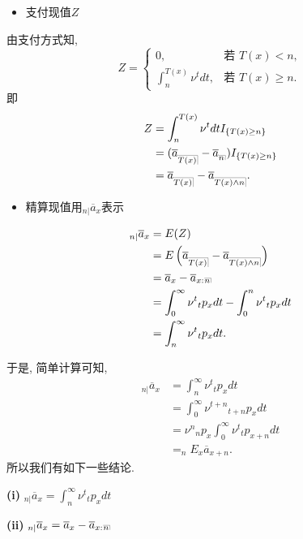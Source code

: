 \documentclass[a4paper,openany, 10pt]{ctexbook}
\makeatletter
\newcommand{\hei}{\CJKfamily{hei}}      %
\def\z{\left}
\def\y{\right}
\DeclareRobustCommand{\annu}[1]{_{%
    \def\arraystretch{0}%
    \setlength\arraycolsep{1pt}%
    \setlength\arrayrulewidth{.2pt}%
    \begin{array}[b]{@{}c|}\hline
        \\[\arraycolsep]%
        \scriptstyle #1%
    \end{array}%
}}
\makeatother
\begin{document}
\begin{itemize}
    \item[{\bf\hei2.}] 支付现值$Z$
\end{itemize}
由支付方式知,
$$
    Z=
    \begin{cases}
        0,                           & \text{若 } T(x) < n ,   \\
         \int_n^{T(x)} \nu^tdt, & \text{若 } T(x) \geq n.
    \end{cases}$$
即$$
    \begin{aligned}
    Z& =\int_n^{T(x)} \nu^tdtI_{\{T(x)\ge n\}}\\ &=(\overline{a}_{\annu{T(x)}}-\overline{a}_{\annu n})I_{\{T(x)\ge n\}}\\
    &=\overline{a}_{\annu {T(x)}} - \overline{a}_{\annu {T(x) \land n}}.
    \end{aligned}
$$
\begin{itemize}
    \item[{\bf\hei3.}] 精算现值用$_{n|}\overline{a}_{x}$表示
\end{itemize}
$$
    \begin{aligned}
        _{n|}\overline{a}_{x}& = E(Z) \\
        &= E\z(\overline{a}_{\annu {T(x)}} - \overline{a}_{\annu {T(x) \land n}}\y)\\
                   & = \overline a_{x}-\overline a_{x:}{}\annu n                                                \\
                   & = \int_0^{\infty}\nu^{t}{}_tp_xdt-\int_0^{n} \nu^{t}{}_tp_xdt\\
                   & =\int_n^{\infty}\nu^{t}{}_tp_xdt.
    \end{aligned}
$$

于是, 简单计算可知,
$$
    \begin{aligned}
        _{n|}\overline{a}_{x}& = \int_n^{\infty}\nu^{t}{}_tp_xdt \\
        &= \int_0^{\infty}\nu^{t+n}{}_{t+n}p_xdt \\
                   & =\nu^{n}{}_{n}p_x \int_0^{\infty}\nu^{t}{}_{t}p_{x+n}dt \\
                   & =_nE_x\overline{a}_{x+n}.
    \end{aligned}
$$
所以我们有如下一些结论.

{\rm\bf(i)} $_{n|}\overline{a}_{x}=\int_n^{\infty}\nu^{t}{}_tp_xdt$

{\rm\bf(ii)} $_{n|}\overline{a}_{x}=\overline{a}_{x}-\overline{a}_{x:}{}\annu{n}$
\end{document}
